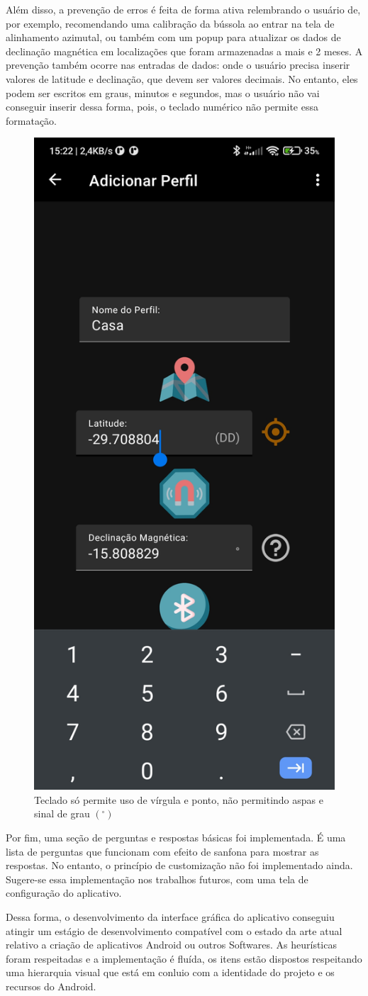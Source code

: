 Além disso, a prevenção de erros é feita de forma ativa relembrando o usuário de, por exemplo, recomendando uma calibração da bússola ao entrar na tela de alinhamento azimutal, ou também com um popup para atualizar os dados de declinação magnética em localizações que foram armazenadas a mais e 2 meses. A prevenção também ocorre nas entradas de dados:  onde o usuário precisa inserir valores de latitude e declinação, que devem ser valores decimais. No entanto, eles podem ser escritos em graus, minutos e segundos, mas o usuário não vai conseguir inserir dessa forma, pois, o teclado numérico não permite essa formatação.

\begin{figure}[!htb]
	\centering
	\includegraphics[width=0.3\linewidth]{figuras/resultados/gpsedit}
	\caption{Teclado só permite uso de vírgula e ponto, não permitindo aspas e sinal de grau $ (^\circ) $}
	\label{fig:gpsedit}
\end{figure}

Por fim, uma seção de perguntas e respostas básicas foi implementada. É uma lista de perguntas que funcionam com efeito de sanfona para mostrar as respostas. No entanto, o princípio de customização não foi implementado ainda. Sugere-se essa implementação nos trabalhos futuros, com uma tela de configuração do aplicativo. 

Dessa forma, o desenvolvimento da interface gráfica do aplicativo conseguiu atingir um estágio de desenvolvimento compatível com o estado da arte atual relativo a criação de aplicativos Android ou outros Softwares. As heurísticas foram respeitadas e a implementação é fluída, os itens estão dispostos respeitando uma hierarquia visual que está em conluio com a identidade do projeto e os recursos do Android. 

